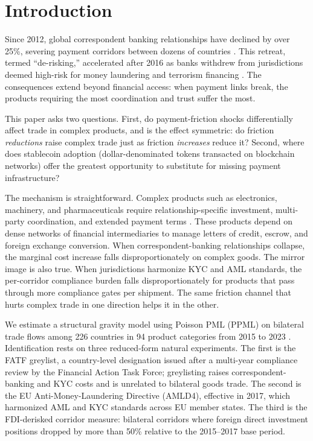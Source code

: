 \section{Introduction}
\label{sec:intro}

Since 2012, global correspondent banking relationships have declined by over 25\%, severing payment corridors between dozens of countries \citep{Rice2020_correspondent}. This retreat, termed ``de-risking,'' accelerated after 2016 as banks withdrew from jurisdictions deemed high-risk for money laundering and terrorism financing \citep{Borchert2024_broken_relationships}. The consequences extend beyond financial access: when payment links break, the products requiring the most coordination and trust suffer the most.

This paper asks two questions. First, do payment-friction shocks differentially affect trade in complex products, and is the effect symmetric: do friction \emph{reductions} raise complex trade just as friction \emph{increases} reduce it? Second, where does stablecoin adoption (dollar-denominated tokens transacted on blockchain networks) offer the greatest opportunity to substitute for missing payment infrastructure?

The mechanism is straightforward. Complex products such as electronics, machinery, and pharmaceuticals require relationship-specific investment, multi-party coordination, and extended payment terms \citep{Manova2013_credit_constraints, AntrasFolley2015_trade_finance}. These products depend on dense networks of financial intermediaries to manage letters of credit, escrow, and foreign exchange conversion. When correspondent-banking relationships collapse, the marginal cost increase falls disproportionately on complex goods. The mirror image is also true. When jurisdictions harmonize KYC and AML standards, the per-corridor compliance burden falls disproportionately for products that pass through more compliance gates per shipment. The same friction channel that hurts complex trade in one direction helps it in the other.

We estimate a structural gravity model using Poisson PML (PPML) on bilateral trade flows among 226 countries in 94 product categories from 2015 to 2023 \citep{SantosSilva2006_ppml}. Identification rests on three reduced-form natural experiments. The first is the FATF greylist, a country-level designation issued after a multi-year compliance review by the Financial Action Task Force; greylisting raises correspondent-banking and KYC costs and is unrelated to bilateral goods trade. The second is the EU Anti-Money-Laundering Directive (AMLD4), effective in 2017, which harmonized AML and KYC standards across EU member states. The third is the FDI-derisked corridor measure: bilateral corridors where foreign direct investment positions dropped by more than 50\% relative to the 2015--2017 base period.


